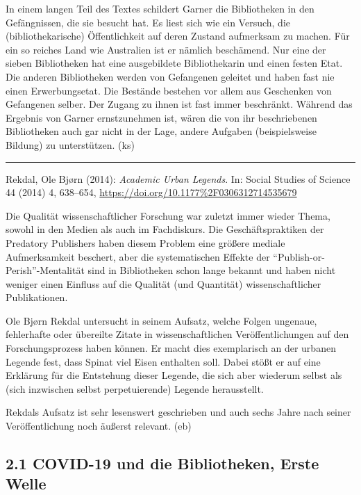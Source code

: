 \documentclass[a4paper,
fontsize=11pt,
oneside,
numbers=noperiodatend,
parskip=half-,
bibliography=totoc,
final
]{scrartcl}
\begin{document}
In einem langen Teil des Textes schildert Garner die Bibliotheken in den
Gefängnissen, die sie besucht hat. Es liest sich wie ein Versuch, die
(bibliothekarische) Öffentlichkeit auf deren Zustand aufmerksam zu
machen. Für ein so reiches Land wie Australien ist er nämlich
beschämend. Nur eine der sieben Bibliotheken hat eine ausgebildete
Bibliothekarin und einen festen Etat. Die anderen Bibliotheken werden
von Gefangenen geleitet und haben fast nie einen Erwerbungsetat. Die
Bestände bestehen vor allem aus Geschenken von Gefangenen selber. Der
Zugang zu ihnen ist fast immer beschränkt. Während das Ergebnis von
Garner ernstzunehmen ist, wären die von ihr beschriebenen Bibliotheken
auch gar nicht in der Lage, andere Aufgaben (beispielsweise Bildung) zu
unterstützen. (ks)

\begin{center}\rule{0.5\linewidth}{0.5pt}\end{center}

Rekdal, Ole Bjørn (2014): \emph{Academic Urban Legends}. In: Social
Studies of Science 44 (2014) 4, 638--654,
\url{https://doi.org/10.1177\%2F0306312714535679}

Die Qualität wissenschaftlicher Forschung war zuletzt immer wieder
Thema, sowohl in den Medien als auch im Fachdiskurs. Die
Geschäftspraktiken der Predatory Publishers haben diesem Problem eine
größere mediale Aufmerksamkeit beschert, aber die systematischen Effekte
der \enquote{Publish-or-Perish}-Mentalität sind in Bibliotheken schon
lange bekannt und haben nicht weniger einen Einfluss auf die Qualität
(und Quantität) wissenschaftlicher Publikationen.

Ole Bjørn Rekdal untersucht in seinem Aufsatz, welche Folgen ungenaue,
fehlerhafte oder übereilte Zitate in wissenschaftlichen
Veröffentlichungen auf den Forschungsprozess haben können. Er macht dies
exemplarisch an der urbanen Legende fest, dass Spinat viel Eisen
enthalten soll. Dabei stößt er auf eine Erklärung für die Entstehung
dieser Legende, die sich aber wiederum selbst als (sich inzwischen
selbst perpetuierende) Legende herausstellt.

Rekdals Aufsatz ist sehr lesenswert geschrieben und auch sechs Jahre
nach seiner Veröffentlichung noch äußerst relevant. (eb)

\hypertarget{covid-19-und-die-bibliotheken-erste-welle}{%
\subsection{2.1 COVID-19 und die Bibliotheken, Erste
Welle}\label{covid-19-und-die-bibliotheken-erste-welle}}
\end{document}

